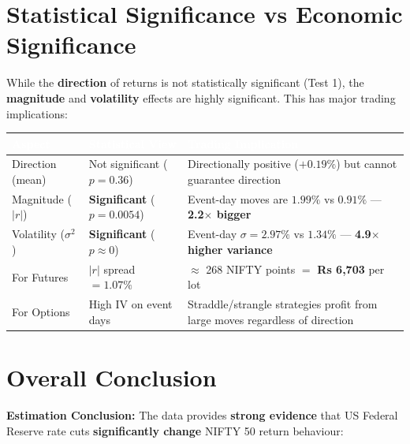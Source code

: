 \documentclass[12pt,a4paper]{article}
\begin{document}
\section{Statistical Significance vs Economic Significance}

While the \textbf{direction} of returns is not statistically significant (Test 1), the \textbf{magnitude} and \textbf{volatility} effects are highly significant. This has major trading implications:

\begin{table}[H]
\centering
\begin{tabularx}{\textwidth}{|l|X|X|}
\hline
\rowcolor{hdrbg} \textcolor{white}{\textbf{Aspect}} & \textcolor{white}{\textbf{Statistical View}} & \textcolor{white}{\textbf{Trading Implication}} \\
\hline
Direction (mean) & Not significant ($p=0.36$) & Directionally positive ($+0.19\%$) but cannot guarantee direction \\
\hline
\rowcolor{sigbg}
Magnitude ($|r|$) & \textbf{Significant} ($p=0.0054$) & Event-day moves are $1.99\%$ vs $0.91\%$ --- \textbf{2.2$\times$ bigger} \\
\hline
\rowcolor{sigbg}
Volatility ($\sigma^2$) & \textbf{Significant} ($p \approx 0$) & Event-day $\sigma = 2.97\%$ vs $1.34\%$ --- \textbf{4.9$\times$ higher variance} \\
\hline
For Futures & $|r|$ spread $= 1.07\%$ & $\approx$ 268 NIFTY points $=$ \textbf{Rs 6,703} per lot \\
\hline
\rowcolor{rowalt}
For Options & High IV on event days & Straddle/strangle strategies profit from large moves regardless of direction \\
\hline
\end{tabularx}
\end{table}

\section{Overall Conclusion}

\textbf{Estimation Conclusion:} The data provides \textbf{strong evidence} that US Federal Reserve rate cuts \textbf{significantly change} NIFTY 50 return behaviour:
\end{document}
